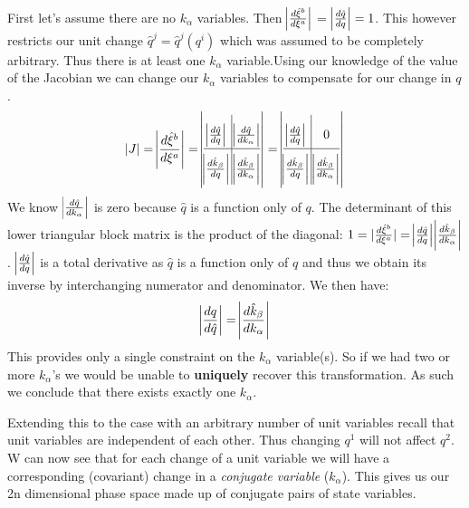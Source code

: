 \documentclass{article}
\begin{document}
	First let's assume there are no $k_\alpha$ variables. Then $\abs{\frac{d\hat{\xi}^b}{d\xi^a}}$ = $\abs{\frac{d\hat{q}}{dq}} = 1$. This however restricts our unit change $\hat{q}^j = \hat{q}^j(q^i)$ which was assumed to be completely arbitrary. Thus there is at least one $k_\alpha$ variable.Using our knowledge of the value of the Jacobian we can change our $k_\alpha$ variables to compensate for our change in $q$.
	\begin{equation}
	\label{}
	\abs{J} = \abs{\frac{d\hat{\xi}^b}{d\xi^a}} = \abs{ \arraycolsep=1.7pt\def\arraystretch{2.2}
	\begin{array}{@{}c|c@{}} \abs{\frac{d\hat{q}}{dq}} & \abs{\frac{d\hat{q}}{dk_\alpha}} \\
\hline \abs{\frac{d\hat{k}_\beta}{dq}} & \abs{\frac{d\hat{k}_\beta}{dk_\alpha}}
\end{array}	} = \abs{ \arraycolsep=1.7pt\def\arraystretch{2.2}
	\begin{array}{@{}c|c@{}} \abs{\frac{d\hat{q}}{dq}} & 0 \\
\hline \abs{\frac{d\hat{k}_\beta}{dq}} & \abs{\frac{d\hat{k}_\beta}{dk_\alpha}}
\end{array}	}
	\end{equation}
We know $\abs{\frac{d\hat{q}}{dk_\alpha}}$ is zero because $\hat{q}$ is a function only of $q$. The determinant of this lower triangular block matrix is the product of the diagonal: $1 = |\frac{d\hat{\xi}^b}{d\xi^a}| = \abs{\frac{d\hat{q}}{dq}}\abs{\frac{d\hat{k}_\beta}{dk_\alpha}}$. $\abs{\frac{d\hat{q}}{dq}}$ is a total derivative as $\hat{q}$ is a function only of $q$ and thus we obtain its inverse by interchanging numerator and denominator. We then have:
	\begin{equation}
	\label{}
	 \abs{\frac{dq}{d\hat{q}}} = \abs{\frac{d\hat{k}_\beta}{dk_\alpha}}
	\end{equation}
This provides only a single constraint on the $k_\alpha$ variable(s). So if we had two or more $k_\alpha$'s we would be unable to \textbf{uniquely} recover this transformation. As such we conclude that there exists exactly one $k_\alpha$. 

	Extending this to the case with an arbitrary number of unit variables recall that unit variables are independent of each other. Thus changing $q^1$ will not affect $q^2$. W can now see that for each change of a unit variable we will have a corresponding (covariant) change in a \textit{conjugate variable} ($k_\alpha$). This gives us our 2n dimensional phase space made up of conjugate pairs of state variables. 
\end{document}
